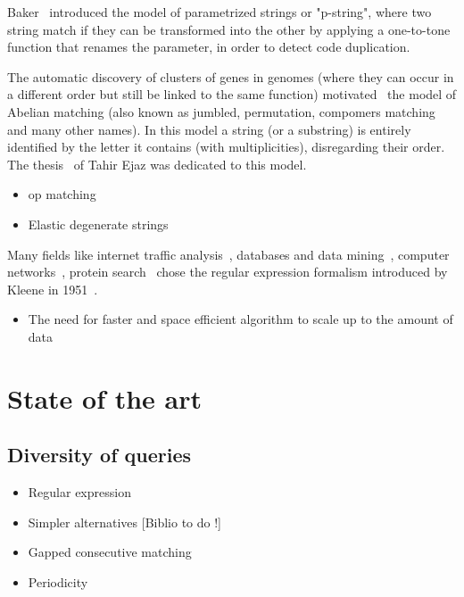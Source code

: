 Baker~\cite{baker1993theory} introduced the model of parametrized strings or "p-string", where two string match if they can be transformed into the other by applying a one-to-tone function that renames the parameter, in order to detect code duplication.

The automatic discovery of clusters of genes in genomes (where they can occur in a different order but still be linked to the same function) motivated~\cite{eres2004permutation} the model of Abelian matching (also known as jumbled, permutation, compomers matching and many other names). In this model a string (or a substring) is entirely identified by the letter it contains (with multiplicities), disregarding their order. The thesis~\cite{ejaz2010abelian} of Tahir Ejaz was dedicated to this model.


\begin{itemize}
    \item op matching
    \item Elastic degenerate strings 
\end{itemize}

Many fields like internet traffic analysis~\cite{4221791,4579527}, databases and data mining~\cite{1000341,10.5555/645927.672035,10.1145/375551.375569}, computer networks~\cite{10.1145/1159913.1159952}, protein search~\cite{10.1145/369133.369220} chose the regular expression formalism introduced by Kleene in 1951~\cite{RM-704}.



\begin{itemize}
\item The need for faster and space efficient algorithm to scale up to the amount of data
\end{itemize}

\section{State of the art}

\subsection{Diversity of queries}
\begin{itemize}
\item Regular expression
\item Simpler alternatives [Biblio to do !]
\item Gapped consecutive matching
\item Periodicity
\end{itemize}

